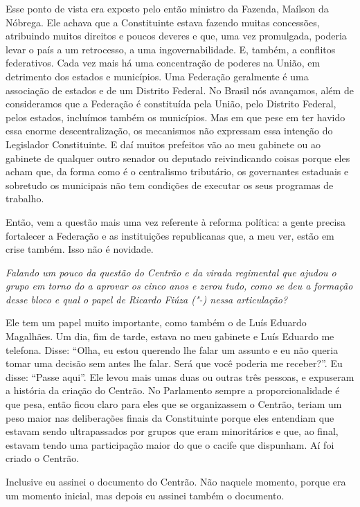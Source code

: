 Esse ponto de vista era exposto pelo então ministro da
Fazenda, Maílson da Nóbrega. Ele achava que a Constituinte estava
fazendo muitas concessões, atribuindo muitos direitos e poucos deveres e
que, uma vez promulgada, poderia levar o país a um retrocesso, a uma
ingovernabilidade. E, também, a conflitos federativos. Cada vez mais há
uma concentração de poderes na União, em detrimento dos estados e
municípios. Uma Federação geralmente é uma associação de estados e de um
Distrito Federal. No Brasil nós avançamos, além de consideramos que a
Federação é constituída pela União, pelo Distrito Federal, pelos
estados, incluímos também os municípios. Mas em que pese em ter havido
essa enorme descentralização, os mecanismos não expressam essa intenção
do Legislador Constituinte. E daí muitos prefeitos vão ao meu gabinete
ou ao gabinete de qualquer outro senador ou deputado reivindicando
coisas porque eles acham que, da forma como é o centralismo tributário,
os governantes estaduais e sobretudo os municipais não tem condições de
executar os seus programas de trabalho.

Então, vem a questão mais uma vez referente à reforma política: a gente
precisa fortalecer a Federação e as instituições republicanas que, a meu
ver, estão em crise também. Isso não é novidade.

\medskip

\noindent\emph{Falando um pouco da questão do Centrão e da virada regimental
que ajudou o grupo em torno do  a aprovar os cinco anos e zerou tudo,
como se deu a formação desse bloco e qual o papel de Ricardo Fiúza
("-) nessa articulação? }

Ele tem um papel muito importante, como também o de
Luís Eduardo Magalhães. Um dia, fim de tarde, estava no meu gabinete e
Luís Eduardo me telefona. Disse: ``Olha, eu estou querendo lhe falar um
assunto e eu não queria tomar uma decisão sem antes lhe falar. Será que
você poderia me receber?''. Eu disse: ``Passe aqui''. Ele levou mais
umas duas ou outras três pessoas, e expuseram a história da criação do
Centrão. No Parlamento sempre a proporcionalidade é que pesa, então
ficou claro para eles que se organizassem o Centrão, teriam um peso
maior nas deliberações finais da Constituinte porque eles entendiam que
estavam sendo ultrapassados por grupos que eram minoritários e que, ao
final, estavam tendo uma participação maior do que o cacife que
dispunham. Aí foi criado o Centrão.

Inclusive eu assinei o documento do Centrão. Não naquele momento, porque
era um momento inicial, mas depois eu assinei também o documento.

